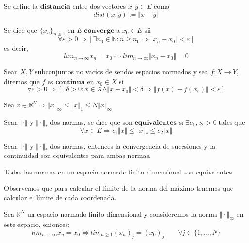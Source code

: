 \begin{ndef}[Distancia]
Se define la $\textbf{distancia}$ entre dos vectores $x,y \in E$ como
\[ dist(x,y) := \Vert x - y \Vert \]
\end{ndef}

\begin{ndef}[Converge]
Se dice que $\lbrace x_n \rbrace _{n \geq 1}$ en $E$ $\textbf{converge}$ a $x_0 \in E$ sii
\[ \forall \varepsilon > 0 \Rightarrow \left[ \exists n_0 \in \mathbb{N} : n \geq n_0 \Rightarrow \Vert x_n - x_0 \Vert < \varepsilon \right] \]
es decir,
\[ lim_{n \rightarrow \infty} x_n = x_0  \Leftrightarrow lim_{n \rightarrow \infty} \Vert x_n - x_0 \Vert = 0 \]
\end{ndef}

\begin{ndef}[Continua]
Sean $X, Y$ subconjuntos no vacíos de sendos espacios normados y sea $f: X \rightarrow Y$, diremos que $f$ es $\textbf{continua}$ en $x_{0} \in X$ si
\[ \forall \varepsilon > 0 \Rightarrow \left[ \exists \delta > 0 : x \in X \wedge \Vert x - x_0 \Vert < \delta \Rightarrow \Vert f(x) - f(x_0) \Vert < \varepsilon \right] \]
\end{ndef}

\begin{nprop}
Sea $x \in \mathbb{R}^N \Rightarrow \Vert x \Vert _\infty \leq \Vert x \Vert _1 \leq N\Vert x \Vert _\infty $ 
\end{nprop}

\begin{ndef}
Sean $\Vert \cdot \Vert$ y $\Vert \cdot \Vert _*$ dos normas, se dice que son $\textbf{equivalentes}$ si $\exists c_1, c_2 > 0$ tales que
\[ \forall x \in E \Rightarrow c_1\Vert x \Vert \leq \Vert x \Vert _* \leq c_2\Vert x \Vert \] 
\end{ndef}

\begin{nprop}
Sean $\Vert \cdot \Vert$ y $\Vert \cdot \Vert _*$ dos normas, entonces la convergencia de sucesiones y la continuidad son equivalentes para ambas normas. 
\end{nprop}

\begin{nth}
Todas las normas en un espacio normado finito dimensional son equivalentes.
\end{nth}

Observemos que para calcular el límite de la norma del máximo tenemos que calcular el límite de cada coordenada.

\begin{nprop}
Sea $\mathbb{R}^N$ un espacio normado finito dimensional y consideremos la norma $\Vert \cdot \Vert _\infty$ en este espacio, entonces:
\[ lim_{n \rightarrow \infty}x_n = x_0 \Leftrightarrow lim_{n \geq 1}(x_n)_j = (x_0)_j \qquad \forall j\in \lbrace 1,...,N \rbrace \]
\end{nprop}

